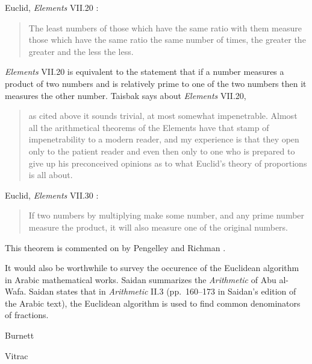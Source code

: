 \documentclass{article}
\begin{document}
Euclid, {\em Elements} VII.20 \cite[p.~320]{euclidII}:

\begin{quote}
The least numbers of those which have the same ratio with
them measure those which have the same ratio the same number
of times, the greater the greater and the less the less.
\end{quote}

{\em Elements} VII.20 is equivalent to the statement that if a number measures a product of two numbers
and is relatively prime to one of the two numbers then it measures the other number. 
Taisbak \cite[p.~9, Chapter 1]{taisbak} says about {\em Elements} VII.20,

\begin{quote}
as cited above it sounds trivial, at most somewhat impenetrable. Almost all the
arithmetical theorems of the Elements have that stamp of impenetrability to a modern
reader, and my experience is that they open only to the patient reader and even then
only to one who is prepared to give up his preconceived opinions as to what
Euclid's theory of proportions is all about.
\end{quote}


Euclid, {\em Elements} VII.30 \cite[p.~331]{euclidII}:

\begin{quote}
If two numbers by multiplying make some number,
and any prime number measure the product, it will
also measure one of the original numbers.
\end{quote}

This theorem is commented on by Pengelley and Richman \cite{pengelley}.

It would also be worthwhile to survey the occurence of the Euclidean algorithm in Arabic
mathematical works. 
Saidan \cite{saidan} summarizes the {\em Arithmetic} of Abu al-Wafa. Saidan \cite[p.~371]{saidan} states that
in {\em Arithmetic} II.3 (pp.~160--173 in Saidan's edition of the Arabic text),  the Euclidean algorithm is used 
to find common denominators of fractions.


Burnett \cite{burnett2010}

Vitrac \cite{vitrac2}



\end{document}

